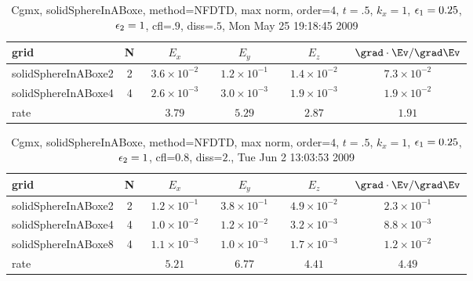 \begin{table}[hbt]\tableFont %
\begin{center}
\begin{tabular}{|l|c|c|c|c|c|} \hline 
grid  & N &  $E_x$ &  $E_y$ & $E_z$ & $\grad\cdot\Ev/\grad\Ev$\\ \hline 
 solidSphereInABoxe2 &     2 & ~$3.6\times10^{ -2}$~ & ~$1.2\times10^{ -1}$~ & ~$1.4\times10^{ -2}$~ & ~$7.3\times10^{ -2}$~  \\ \hline
 solidSphereInABoxe4 &     4 & ~$2.6\times10^{ -3}$~ & ~$3.0\times10^{ -3}$~ & ~$1.9\times10^{ -3}$~ & ~$1.9\times10^{ -2}$~  \\ \hline
    rate             &       &       $3.79$          &       $5.29$          &       $2.87$          &       $1.91$           \\ \hline
\end{tabular}
\caption{Cgmx, solidSphereInABoxe, method=NFDTD, max norm, order=$4$, $t=.5$, $k_x=1$, $\epsilon_1=0.25$, $\epsilon_2=1$, cfl=$.9$, diss=$.5$, Mon May 25 19:18:45 2009}\label{table:dielectricSphereNFDTDOrder4max}
\end{center}
\end{table}

\begin{table}[hbt]\tableFont %
\begin{center}
\begin{tabular}{|l|c|c|c|c|c|} \hline 
grid  & N &  $E_x$ &  $E_y$ & $E_z$ & $\grad\cdot\Ev/\grad\Ev$\\ \hline 
 solidSphereInABoxe2 &     2 & ~$1.2\times10^{ -1}$~ & ~$3.8\times10^{ -1}$~ & ~$4.9\times10^{ -2}$~ & ~$2.3\times10^{ -1}$~  \\ \hline
 solidSphereInABoxe4 &     4 & ~$1.0\times10^{ -2}$~ & ~$1.2\times10^{ -2}$~ & ~$3.2\times10^{ -3}$~ & ~$8.8\times10^{ -3}$~  \\ \hline
 solidSphereInABoxe8 &     4 & ~$1.1\times10^{ -3}$~ & ~$1.0\times10^{ -3}$~ & ~$1.7\times10^{ -3}$~ & ~$1.2\times10^{ -2}$~  \\ \hline
    rate             &       &       $5.21$          &       $6.77$          &       $4.41$          &       $4.49$           \\ \hline
\end{tabular}
\caption{Cgmx, solidSphereInABoxe, method=NFDTD, max norm, order=$4$, $t=.5$, $k_x=1$, $\epsilon_1=0.25$, $\epsilon_2=1$, cfl=$0.8$, diss=$2.$, Tue Jun  2 13:03:53 2009}\label{table:dielectricSphereNFDTDOrder4max}
\end{center}
\end{table}



